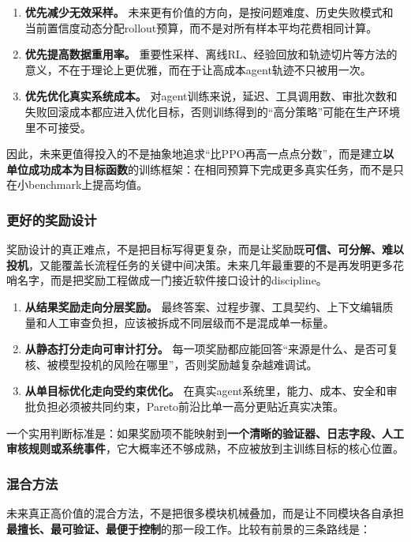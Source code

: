 \documentclass[12pt,a4paper]{article}
\begin{document}
\begin{enumerate}
    \item \textbf{优先减少无效采样。} 未来更有价值的方向，是按问题难度、历史失败模式和当前置信度动态分配rollout预算，而不是对所有样本平均花费相同计算。
    \item \textbf{优先提高数据重用率。} 重要性采样、离线RL、经验回放和轨迹切片等方法的意义，不在于理论上更优雅，而在于让高成本agent轨迹不只被用一次。
    \item \textbf{优先优化真实系统成本。} 对agent训练来说，延迟、工具调用数、审批次数和失败回滚成本都应进入优化目标，否则训练得到的“高分策略”可能在生产环境里不可接受。
\end{enumerate}

因此，未来更值得投入的不是抽象地追求“比PPO再高一点点分数”，而是建立\textbf{以单位成功成本为目标函数}的训练框架：在相同预算下完成更多真实任务，而不是只在小benchmark上提高均值。

\subsubsection{更好的奖励设计}

奖励设计的真正难点，不是把目标写得更复杂，而是让奖励既\textbf{可信、可分解、难以投机}，又能覆盖长流程任务的关键中间决策。未来几年最重要的不是再发明更多花哨名字，而是把奖励工程做成一门接近软件接口设计的discipline。

\begin{enumerate}
    \item \textbf{从结果奖励走向分层奖励。} 最终答案、过程步骤、工具契约、上下文编辑质量和人工审查负担，应该被拆成不同层级而不是混成单一标量。
    \item \textbf{从静态打分走向可审计打分。} 每一项奖励都应能回答“来源是什么、是否可复核、被模型投机的风险在哪里”，否则奖励越复杂越难调试。
    \item \textbf{从单目标优化走向受约束优化。} 在真实agent系统里，能力、成本、安全和审批负担必须被共同约束，Pareto前沿比单一高分更贴近真实决策。
\end{enumerate}

一个实用判断标准是：如果奖励项不能映射到\textbf{一个清晰的验证器、日志字段、人工审核规则或系统事件}，它大概率还不够成熟，不应被放到主训练目标的核心位置。

\subsubsection{混合方法}

未来真正高价值的混合方法，不是把很多模块机械叠加，而是让不同模块各自承担\textbf{最擅长、最可验证、最便于控制}的那一段工作。比较有前景的三条路线是：
\end{document}
